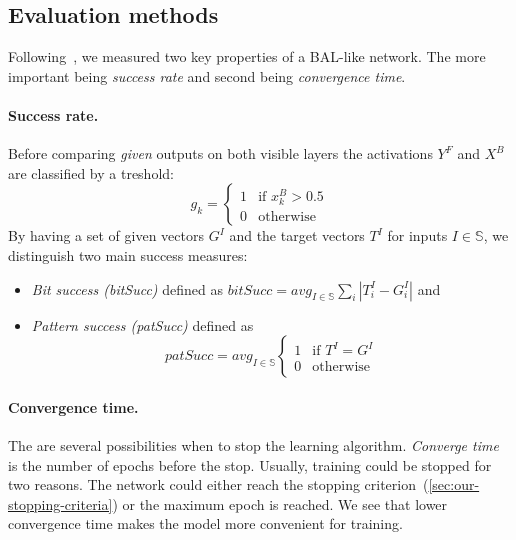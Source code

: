 
\subsection{Evaluation methods} 
\label{sec:sim-evaluation} 

Following~\citet{farkas2013bal}, we measured two key properties of a BAL-like network. The more important being \emph{success rate} and second being \emph{convergence time}. 

\paragraph{Success rate.}  
Before comparing \emph{given} outputs on both visible layers the activations $Y^F$ and $X^B$ are classified by a treshold: 
\begin{equation} 
  g_k =
  \left\{
	  \begin{array}{ll}
		  1 & \mbox{if } x_k^B > 0.5 \\
		  0 & \mbox{otherwise}
	  \end{array}
  \right.  
\end{equation} 
By having a set of given vectors $G^I$ and the target vectors $T^I$ for inputs $I \in \mathbb{S}$, we distinguish two main success measures: 
\begin{itemize}
  \item \emph{Bit success (bitSucc)} defined as $bitSucc = avg_{I \in \mathbb{S}} \sum_i |T_i^I - G^I_i|$ and 
  \item \emph{Pattern success (patSucc)} defined as 
    \begin{equation}
      patSucc = avg_{I \in \mathbb{S}} \left\{
	      \begin{array}{ll}
		      1 & \mbox{if } T^I = G^I \\
		      0 & \mbox{otherwise}
	      \end{array}
      \right.
    \end{equation} 
\end{itemize} 

\paragraph{Convergence time.} The are several possibilities when to stop the learning algorithm. \emph{Converge time} is the number of epochs before the stop. Usually, training could be stopped for two reasons. The network could either reach the stopping criterion~(\ref{sec:our-stopping-criteria}) or the maximum epoch is reached. We see that lower convergence time makes the model more convenient for training.  
